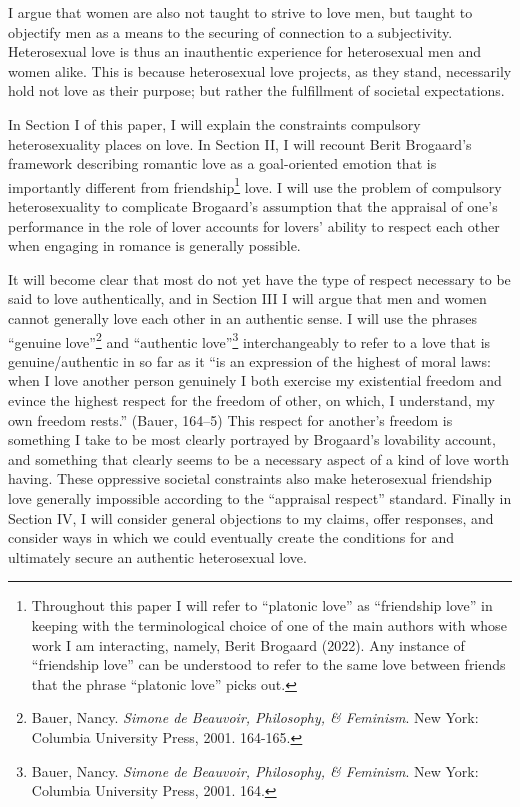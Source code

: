 I argue that women are also not taught to strive to love men, but taught
to objectify men as a means to the securing of connection to a
subjectivity. Heterosexual love is thus an inauthentic experience for
heterosexual men and women alike. This is because heterosexual love
projects, as they stand, necessarily hold not love as their purpose; but
rather the fulfillment of societal expectations.

In Section I of this paper, I will explain the constraints compulsory
heterosexuality places on love. In Section II, I will recount Berit
Brogaard's framework describing romantic love as a goal-oriented emotion
that is importantly different from friendship\footnote{Throughout this
  paper I will refer to ``platonic love'' as ``friendship love'' in
  keeping with the terminological choice of one of the main authors with
  whose work I am interacting, namely, Berit Brogaard (2022). Any
  instance of ``friendship love'' can be understood to refer to the same
  love between friends that the phrase ``platonic love'' picks out.}
love. I will use the problem of compulsory heterosexuality to complicate
Brogaard's assumption that the appraisal of one's performance in the
role of lover accounts for lovers' ability to respect each other when
engaging in romance is generally possible.

It will become clear that most do not yet have the type of respect
necessary to be said to love authentically, and in Section III I will
argue that men and women cannot generally love each other in an
authentic sense. I will use the phrases ``genuine love''\footnote{Bauer,
  Nancy. \emph{Simone de Beauvoir, Philosophy, \& Feminism}. New York:
  Columbia University Press, 2001. 164-165.} and ``authentic
love''\footnote{Bauer,  Nancy. \emph{Simone de Beauvoir, Philosophy, \& Feminism}. New York: Columbia University Press, 2001. 164.} interchangeably to refer to a love that
is genuine/authentic in so far as it ``is an expression of the highest
of moral laws: when I love another person genuinely I both exercise my
existential freedom and evince the highest respect for the freedom of
other, on which, I understand, my own freedom rests.'' (Bauer, 164--5)
This respect for another's freedom is something I take to be most
clearly portrayed by Brogaard's lovability account, and something that
clearly seems to be a necessary aspect of a kind of love worth having.
These oppressive societal constraints also make heterosexual friendship
love generally impossible according to the ``appraisal respect''
standard. Finally in Section IV, I will consider general objections to
my claims, offer responses, and consider ways in which we could
eventually create the conditions for and ultimately secure an authentic
heterosexual love.

